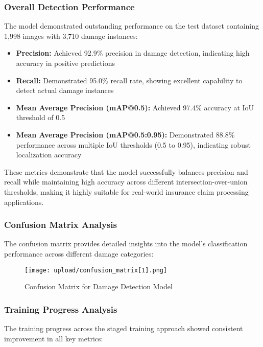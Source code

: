 \documentclass[12pt,a4paper]{report}
\begin{document}
\subsubsection{Overall Detection Performance}

The model demonstrated outstanding performance on the test dataset containing 1,998 images with 3,710 damage instances:

\begin{itemize}
    \item \textbf{Precision:} Achieved 92.9\% precision in damage detection, indicating high accuracy in positive predictions
    \item \textbf{Recall:} Demonstrated 95.0\% recall rate, showing excellent capability to detect actual damage instances
    \item \textbf{Mean Average Precision (mAP@0.5):} Achieved 97.4\% accuracy at IoU threshold of 0.5
    \item \textbf{Mean Average Precision (mAP@0.5:0.95):} Demonstrated 88.8\% performance across multiple IoU thresholds (0.5 to 0.95), indicating robust localization accuracy
\end{itemize}

These metrics demonstrate that the model successfully balances precision and recall while maintaining high accuracy across different intersection-over-union thresholds, making it highly suitable for real-world insurance claim processing applications.

\subsubsection{Confusion Matrix Analysis}

The confusion matrix provides detailed insights into the model's classification performance across different damage categories:

\begin{figure}[H]
    \centering
    \texttt{[image: upload/confusion\_matrix[1].png]}
    \caption{Confusion Matrix for Damage Detection Model}
    \label{fig:confusion_matrix}
\end{figure}

\subsubsection{Training Progress Analysis}

The training progress across the staged training approach showed consistent improvement in all key metrics:
\end{document}
